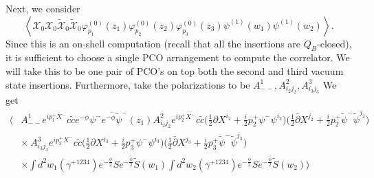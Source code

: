 \documentclass[12pt]{article}
\numberwithin{equation}{section}
\newcommand{\WT}[1]{\widetilde{#1}}
\newcommand{\B}[1]{\bar{#1}}
\begin{document}
Next, we consider
\begin{equation}
    \left\langle \mathcal{X}_0\mathcal{X}_0\WT{\mathcal{X}}_0\WT{\mathcal{X}}_0 \varphi_{p_1}^{(0)}(z_1)\varphi_{p_2}^{(0)}(z_2)\varphi_{p_3}^{(0)}(z_3)\psi^{(1)}(w_1)\psi^{(1)}(w_2)\right\rangle.
\end{equation}
Since this is an on-shell computation (recall that all the insertions are $Q_B$-closed), it is sufficient to choose a single PCO arrangement to compute the correlator. We will take this to be one pair of PCO's on top both the second and third vacuum state insertions. Furthermore, take the polarizations to be $A^1_{--}, A^2_{i_2j_2}, A^3_{i_3j_3}$ We get
\begin{equation}
\begin{split}
    \Big\langle & A^1_{--} e^{ip_1^+ X^-} c\WT{c} e^{-\phi}\psi^{-} e^{-\WT{\phi}}\WT{\psi}^{-}(z_1) A^2_{i_2 j_2} e^{ip_2^+ X^-} c\WT{c} \Big(\frac{1}{2}\partial X^{i_2}+\frac{i}{2}p_2^+\psi^-\psi^{i_2}\Big)\Big(\frac{1}{2}\B{\partial} X^{j_2}+\frac{i}{2}p_2^+\WT{\psi}^-\WT{\psi}^{j_2}\Big)\\
    &\times\ A^3_{i_3 j_3} e^{ip_3^+ X^-} c\WT{c} \Big(\frac{1}{2}\partial X^{i_3}+\frac{i}{2}p_3^+\psi^-\psi^{i_3}\Big)\Big(\frac{1}{2}\B{\partial} X^{j_3}+\frac{i}{2}p_3^+\WT{\psi}^-\WT{\psi}^{j_3}\Big)\\
    &\times \int d^2w_1 (\gamma^{+1234})e^{-\frac{\phi}{2}}Se^{-\frac{\WT{\phi}}{2}}\WT{S}(w_1) \int d^2w_2 (\gamma^{+1234})e^{-\frac{\phi}{2}}Se^{-\frac{\WT{\phi}}{2}}\WT{S}(w_2)\Big\rangle
\end{split}
\end{equation}



















\printbibliography
\end{document}
